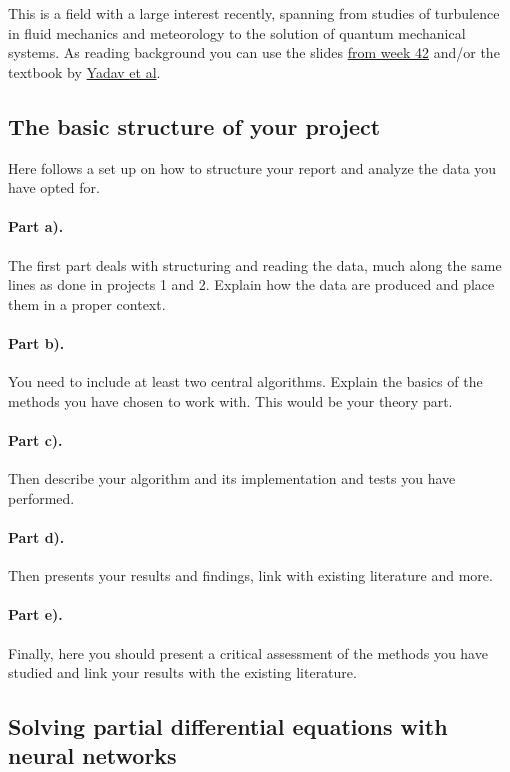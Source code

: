 \documentclass[%
oneside,                 %
final,                   %
10pt]{article}
\begin{document}
This is a field with a large interest recently, spanning from studies of turbulence in fluid mechanics and meteorology to the solution of quantum mechanical systems. As reading background you can use the slides \href{{https://compphysics.github.io/MachineLearning/doc/pub/week42/html/week42.html}}{from week 42} and/or the textbook by \href{{https://www.springer.com/gp/book/9789401798150}}{Yadav et al}.

\subsection{The basic structure of your project}

Here follows a set up on how to structure your report and analyze the data you have opted for.

\paragraph{Part a).}
The first part deals with structuring and reading the data, much along the same lines as done in projects 1 and 2.  Explain how the data are produced and place them in a proper context.

\paragraph{Part b).}
You need to include at least two central algorithms. Explain the basics of the methods you have chosen to work with. This would be your theory part.

\paragraph{Part c).}
Then describe your algorithm and its implementation and tests you have performed.

\paragraph{Part d).}
Then presents your results and findings, link with existing literature and more.

\paragraph{Part e).}
Finally, here you should present a critical assessment of the methods you have studied and link your results with the existing literature. 

\subsection{Solving partial differential equations with neural networks}
\end{document}
